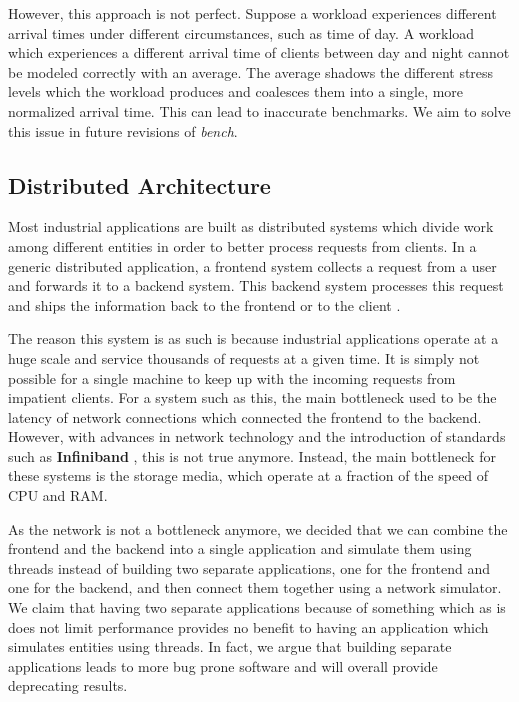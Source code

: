 \documentclass[10pt, author, twocolumn]{article}
\begin{document}
However, this approach is not perfect. Suppose a workload experiences different arrival times under different circumstances, such as time of day. A workload which experiences a different arrival time of clients between day and night cannot be modeled correctly with an average. The average shadows the different stress levels which the workload produces and coalesces them into a single, more normalized arrival time. This can lead to inaccurate benchmarks. We aim to solve this issue in future revisions of \textit{bench}.

\subsection{Distributed Architecture}
Most industrial applications are built as distributed systems which divide work among different entities in order to better process requests from clients. In a generic distributed application, a frontend system collects a request from a user and forwards it to a backend system. This backend system processes this request and ships the information back to the frontend or to the client \cite{tanenbaum2007distributed}. 

The reason this system is as such is because industrial applications operate at a huge scale and service thousands of requests at a given time. It is simply not possible for a single machine to keep up with the incoming requests from impatient clients. For a system such as this, the main bottleneck used to be the latency of network connections which connected the frontend to the backend. However, with advances in network technology and the introduction of standards such as \textbf{Infiniband} \cite{pfister2001introduction}, this is not true anymore. Instead, the main bottleneck for these systems is the storage media, which operate at a fraction of the speed of CPU and RAM. 

As the network is not a bottleneck anymore, we decided that we can combine the frontend and the backend into a single application and simulate them using threads instead of building two separate applications, one for the frontend and one for the backend, and then connect them together using a network simulator. We claim that having two separate applications because of something which as is does not limit performance provides no benefit to having an application which simulates entities using threads. In fact, we argue that building separate applications leads to more bug prone software and will overall provide deprecating results. 
\end{document}
